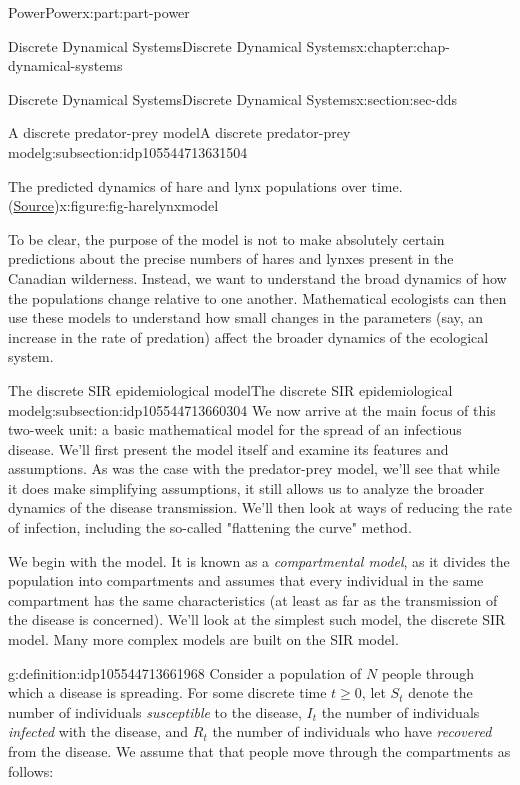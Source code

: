 \documentclass[oneside,10pt,]{book}
\numberwithin{equation}{section}
\renewcommand{\ge}{\geqslant}
\begin{document}
\begin{partptx}{Power}{}{Power}{}{}{x:part:part-power}
\begin{chapterptx}{Discrete Dynamical Systems}{}{Discrete Dynamical Systems}{}{}{x:chapter:chap-dynamical-systems}
\begin{sectionptx}{Discrete Dynamical Systems}{}{Discrete Dynamical Systems}{}{}{x:section:sec-dds}
\begin{subsectionptx}{A discrete predator-prey model}{}{A discrete predator-prey model}{}{}{g:subsection:idp105544713631504}
\begin{figureptx}{The predicted dynamics of hare and lynx populations over time. (\href{https://www.cds.caltech.edu/\~murray/amwiki/index.php/Predator_prey}{Source}\protect\footnotemark{})}{x:figure:fig-harelynxmodel}{}
\begin{image}{0.25}{0.5}{0.25}
\end{image}%
\tcblower
\end{figureptx}%
%
To be clear, the purpose of the model is not to make absolutely certain predictions about the precise numbers of hares and lynxes present in the Canadian wilderness. Instead, we want to understand the broad dynamics of how the populations change relative to one another. Mathematical ecologists can then use these models to understand how small changes in the parameters (say, an increase in the rate of predation) affect the broader dynamics of the ecological system.%
\end{subsectionptx}
%
%
\typeout{************************************************}
\typeout{************************************************}
%
\begin{subsectionptx}{The discrete SIR epidemiological model}{}{The discrete SIR epidemiological model}{}{}{g:subsection:idp105544713660304}
We now arrive at the main focus of this two-week unit: a basic mathematical model for the spread of an infectious disease. We'll first present the model itself and examine its features and assumptions. As was the case with the predator-prey model, we'll see that while it does make simplifying assumptions, it still allows us to analyze the broader dynamics of the disease transmission. We'll then look at ways of reducing the rate of infection, including the so-called "flattening the curve" method.%
\par
We begin with the model. It is known as a \emph{compartmental model}, as it divides the population into compartments and assumes that every individual in the same compartment has the same characteristics (at least as far as the transmission of the disease is concerned). We'll look at the simplest such model, the discrete SIR model. Many more complex models are built on the SIR model.%
\begin{definition}{}{g:definition:idp105544713661968}%
Consider a population of \(N\) people through which a disease is spreading. For some discrete time \(t \ge 0\), let \(S_t\) denote the number of individuals \emph{susceptible} to the disease, \(I_t\) the number of individuals \emph{infected} with the disease, and \(R_t\) the number of individuals who have \emph{recovered} from the disease. We assume that that people move through the compartments as follows:%
%
\begin{equation}

\end{equation}
\end{definition}
\end{subsectionptx}
\end{sectionptx}
\end{chapterptx}
\end{partptx}
\end{document}
